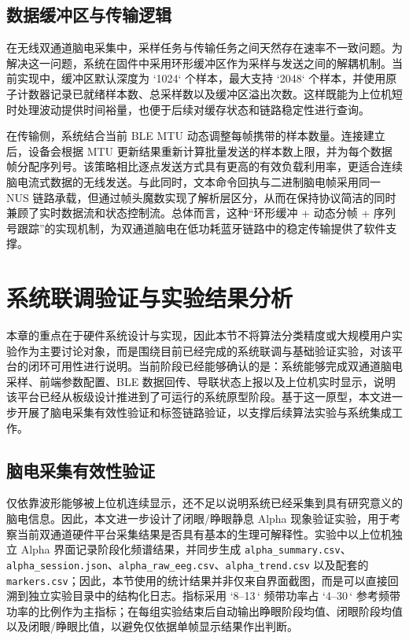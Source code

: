 \subsection{数据缓冲区与传输逻辑}

在无线双通道脑电采集中，采样任务与传输任务之间天然存在速率不一致问题。为解决这一问题，系统在固件中采用环形缓冲区作为采样与发送之间的解耦机制。当前实现中，缓冲区默认深度为 `1024` 个样本，最大支持 `2048` 个样本，并使用原子计数器记录已就绪样本数、总采样数以及缓冲区溢出次数。这样既能为上位机短时处理波动提供时间裕量，也便于后续对缓存状态和链路稳定性进行查询。

在传输侧，系统结合当前 BLE MTU 动态调整每帧携带的样本数量。连接建立后，设备会根据 MTU 更新结果重新计算批量发送的样本数上限，并为每个数据帧分配序列号。该策略相比逐点发送方式具有更高的有效负载利用率，更适合连续脑电流式数据的无线发送。与此同时，文本命令回执与二进制脑电帧采用同一 NUS 链路承载，但通过帧头魔数实现了解析层区分，从而在保持协议简洁的同时兼顾了实时数据流和状态控制流。总体而言，这种“环形缓冲 + 动态分帧 + 序列号跟踪”的实现机制，为双通道脑电在低功耗蓝牙链路中的稳定传输提供了软件支撑。

\section{系统联调验证与实验结果分析}

本章的重点在于硬件系统设计与实现，因此本节不将算法分类精度或大规模用户实验作为主要讨论对象，而是围绕目前已经完成的系统联调与基础验证实验，对该平台的闭环可用性进行说明。当前阶段已经能够确认的是：系统能够完成双通道脑电采样、前端参数配置、BLE 数据回传、导联状态上报以及上位机实时显示，说明该平台已经从板级设计推进到了可运行的系统原型阶段。基于这一原型，本文进一步开展了脑电采集有效性验证和标签链路验证，以支撑后续算法实验与系统集成工作。

\subsection{脑电采集有效性验证}

仅依靠波形能够被上位机连续显示，还不足以说明系统已经采集到具有研究意义的脑电信息。因此，本文进一步设计了闭眼/睁眼静息 Alpha 现象验证实验，用于考察当前双通道硬件平台采集结果是否具有基本的生理可解释性。实验中以上位机独立 Alpha 界面记录阶段化频谱结果，并同步生成 \texttt{alpha\_summary.csv}、\texttt{alpha\_session.json}、\texttt{alpha\_raw\_eeg.csv}、\texttt{alpha\_trend.csv} 以及配套的 \texttt{markers.csv}；因此，本节使用的统计结果并非仅来自界面截图，而是可以直接回溯到独立实验目录中的结构化日志。指标采用 `8--13\,` 频带功率占 `4--30\,` 参考频带功率的比例作为主指标；在每组实验结束后自动输出睁眼阶段均值、闭眼阶段均值以及闭眼/睁眼比值，以避免仅依据单帧显示结果作出判断。

